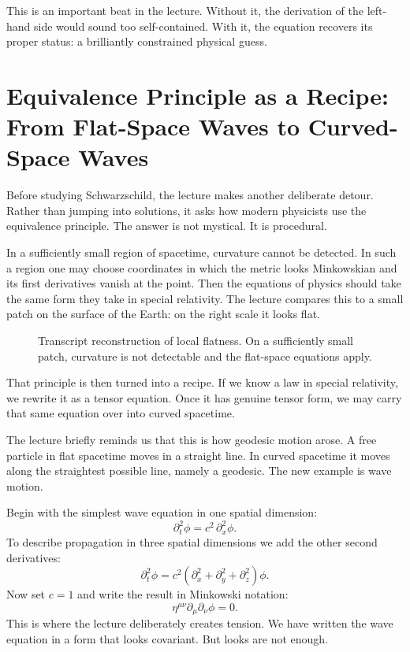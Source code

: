 This is an important beat in the lecture. Without it, the derivation of the left-hand side would sound too self-contained. With it, the equation recovers its proper status: a brilliantly constrained physical guess.

\section{Equivalence Principle as a Recipe: From Flat-Space Waves to Curved-Space Waves}

Before studying Schwarzschild, the lecture makes another deliberate detour. Rather than jumping into solutions, it asks how modern physicists use the equivalence principle. The answer is not mystical. It is procedural.

In a sufficiently small region of spacetime, curvature cannot be detected. In such a region one may choose coordinates in which the metric looks Minkowskian and its first derivatives vanish at the point. Then the equations of physics should take the same form they take in special relativity. The lecture compares this to a small patch on the surface of the Earth: on the right scale it looks flat.

\begin{figure}
\centering
{}
\caption{Transcript reconstruction of local flatness. On a sufficiently small patch, curvature is not detectable and the flat-space equations apply.}
\end{figure}

That principle is then turned into a recipe. If we know a law in special relativity, we rewrite it as a tensor equation. Once it has genuine tensor form, we may carry that same equation over into curved spacetime.

The lecture briefly reminds us that this is how geodesic motion arose. A free particle in flat spacetime moves in a straight line. In curved spacetime it moves along the straightest possible line, namely a geodesic. The new example is wave motion.

Begin with the simplest wave equation in one spatial dimension:
\begin{equation}
\partial_t^2\phi=c^2\,\partial_x^2\phi.
\end{equation}
To describe propagation in three spatial dimensions we add the other second derivatives:
\begin{equation}
\partial_t^2\phi
=
c^2\left(\partial_x^2+\partial_y^2+\partial_z^2\right)\phi.
\end{equation}
Now set \(c=1\) and write the result in Minkowski notation:
\begin{equation}
\eta^{\mu\nu}\partial_\mu\partial_\nu\phi=0.
\end{equation}
This is where the lecture deliberately creates tension. We have written the wave equation in a form that looks covariant. But looks are not enough.


